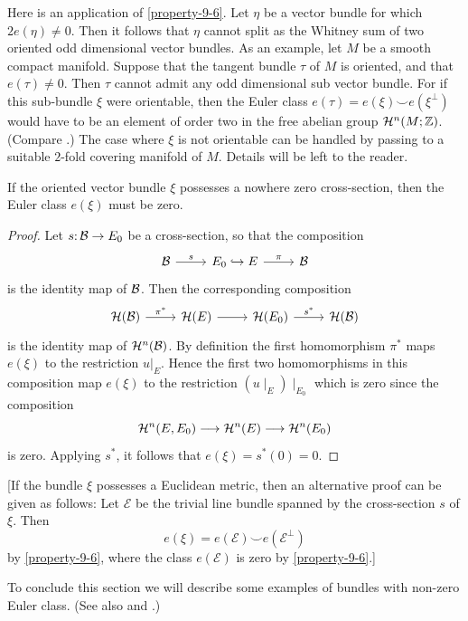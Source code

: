 Here is an application of \cref{property-9-6}. Let $\eta$ be a vector bundle for which $2 e(\eta) \neq 0$. Then it follows that $\eta$ cannot split as the Whitney sum of two oriented odd dimensional vector bundles. As an example, let $M$ be a smooth compact manifold. Suppose that the tangent bundle $\tau$ of $M$ is oriented, and that $e(\tau) \neq 0$. Then $\tau$ cannot admit any odd dimensional sub vector bundle. For if this sub-bundle $\xi$ were orientable, then the Euler class $e(\tau)=e(\xi) \smile e(\xi^{\perp})$ would have to be an element of order two in the free abelian group $\mathcal{H}^{ n }(M ; \mathbb{Z})$. (Compare .) The case where $\xi$ is not orientable can be handled by passing to a suitable $2$-fold covering manifold of $M$. Details will be left to the reader.
\begin{property}\label{property-9-7}
If the oriented vector bundle $\xi$ possesses a nowhere zero cross-section, then the Euler class $e(\xi)$ must be zero.
\end{property}
\begin{proof}
Let $\map{s}{\B}{E_{0}}$ be a cross-section, so that the composition
\[
\begin{tikzcd}
\B  \arrow[r, "s"] & E_0\hookrightarrow E \arrow[r, "\pi"] & \B
\end{tikzcd}
\]
is the identity map of $\mathcal{B}$. Then the corresponding composition
\[
\begin{tikzcd}
	\homology(\B)  \arrow[r, "\pi^*"] & \homology(E)\arrow[r, ""]& \homology(E_0) \arrow[r, "s^*"] & \homology(\B)
\end{tikzcd}
\]
is the identity map of $\mathcal{H}^{ n }(\mathcal{B})$. By definition the first homomorphism $\pi^{*}$ maps $e(\xi)$ to the restriction $u| _{E}$. Hence the first two homomorphisms in this composition map $e(\xi)$ to the restriction $(u\mid_{E})\mid _{E_{0}}$ which is zero since the composition 
\[
\mathcal{H}^{ n }(E, E_{0}) \longrightarrow \mathcal{H}^{ n }(E) \longrightarrow \mathcal{H}^{ n }(E_{0})
\]
is zero. Applying $s^{*}$, it follows that $e(\xi)=s^{*}(0)=0$.


\end{proof} 
[If the bundle $\xi$ possesses a Euclidean metric, then an alternative proof can be given as follows: Let $\mathcal{E}$ be the trivial line bundle spanned by the cross-section $s$ of $\xi$. Then
\[
e(\xi)=e(\mathcal{E}) \smile e(\mathcal{E}^{\perp})
\]
by \cref{property-9-6}, where the class $e(\mathcal{E})$ is zero by \cref{property-9-6}.]

To conclude this section we will describe some examples of bundles with non-zero Euler class. (See also  and .)


